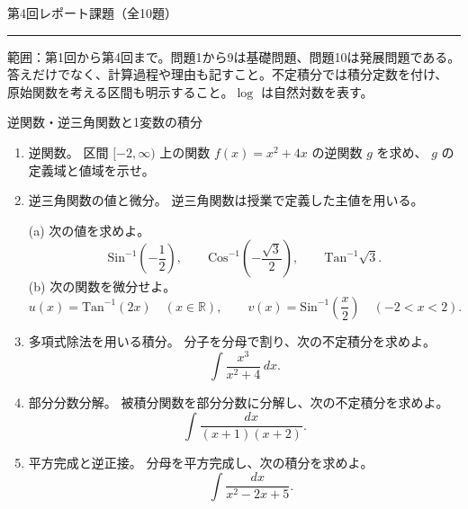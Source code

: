 \documentclass[a4paper,10pt,pdflatex,ja=standard,jafont=ipaex-type1,
  magstyle=real,scale=1]{bxjsarticle}
\newcommand{\handoutnumber}{4}
\newcommand{\handouttitle}[1]{%
  \begin{center}
    {\Large\mdseries\color{ink}#1}\par\vspace{3mm}
    {\color{accent}\rule{0.88\linewidth}{0.7pt}}
  \end{center}\vspace{-2mm}}
\newcommand{\handout}[2]{%
  \renewcommand{\handoutnumber}{#1}%
  \handouttitle{第#1回\quad #2}}
\newcommand{\topic}[1]{\par\vspace{5pt}%
  {\large\sffamily\mdseries\color{accent}#1}\par\vspace{2pt}}
\newcommand{\keybox}[1]{\par\vspace{3pt}\begingroup
  \setlength{\fboxsep}{4pt}%
  \colorbox{soft}{\parbox{\dimexpr\linewidth-2\fboxsep\relax}{\small #1}}%
  \endgroup\par\vspace{2pt}}
\newenvironment{problems}
  {\begin{enumerate}[leftmargin=2.4em,itemsep=3pt,topsep=3pt,parsep=0pt,
    font=\color{accent}]}
  {\end{enumerate}}
\newcommand{\problemlabel}[1]{{\sffamily\mdseries\color{ink}#1}}
\newcommand{\problemspace}[1][14mm]{\par\vspace{#1}}
\begin{document}
\fontsize{10pt}{13.5pt}\selectfont
\setlength{\abovedisplayskip}{4pt}
\setlength{\belowdisplayskip}{4pt}
\handout{4}{レポート課題（全10題）}


\keybox{範囲：第1回から第4回まで。問題1から9は基礎問題、問題10は発展問題である。\\
答えだけでなく、計算過程や理由も記すこと。不定積分では積分定数を付け、
原始関数を考える区間も明示すること。$\log$ は自然対数を表す。}

\topic{逆関数・逆三角関数と1変数の積分}
\begin{problems}
\item \problemlabel{逆関数。}
区間 $[-2,\infty)$ 上の関数 $f(x)=x^2+4x$ の逆関数 $g$ を求め、
$g$ の定義域と値域を示せ。
\problemspace

\item \problemlabel{逆三角関数の値と微分。}
逆三角関数は授業で定義した主値を用いる。
\par (a) 次の値を求めよ。
$$
 \mathrm{Sin}^{-1}\left(-\frac12\right),\qquad
 \mathrm{Cos}^{-1}\left(-\frac{\sqrt3}{2}\right),\qquad
 \mathrm{Tan}^{-1}\sqrt3.
$$
(b) 次の関数を微分せよ。
$$
 u(x)=\mathrm{Tan}^{-1}(2x)\quad(x\in\mathbb R),\qquad
 v(x)=\mathrm{Sin}^{-1}\left(\frac{x}{2}\right)\quad(-2<x<2).
$$
\problemspace

\item \problemlabel{多項式除法を用いる積分。}
分子を分母で割り、次の不定積分を求めよ。
$$
 \int\frac{x^3}{x^2+4}\,dx.
$$
\problemspace

\item \problemlabel{部分分数分解。}
被積分関数を部分分数に分解し、次の不定積分を求めよ。
$$
 \int\frac{dx}{(x+1)(x+2)}.
$$
\problemspace

\item \problemlabel{平方完成と逆正接。}
分母を平方完成し、次の積分を求めよ。
$$
\quad\int\frac{dx}{x^2-2x+5}.
$$
\problemspace
\end{problems}
\end{document}
